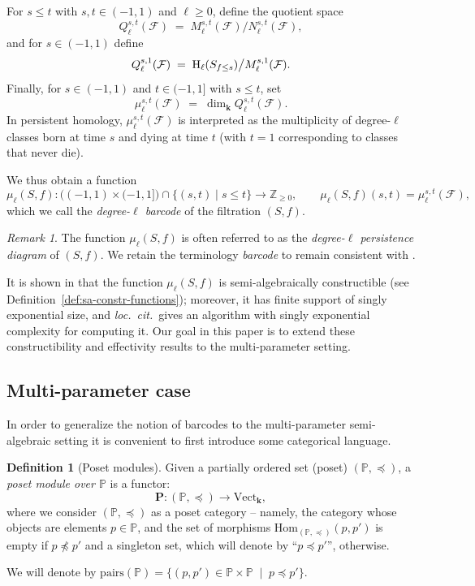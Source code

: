 \documentclass{amsart}[10pts]
\theoremstyle{definition}
\newtheorem{definition}{Definition}[section]
\theoremstyle{remark}
\newtheorem{remark}{Remark}
\theoremstyle{observation}
\numberwithin{equation}{section}
\newcommand {\Z}  {\mathbb{Z}}
\newcommand {\kk}         {\mathbf{k}}
\newcommand {\PP}     {\mathbb{P}} %
\newcommand{\HH}  {\mbox{\rm H}}
\newcommand{\Hom}{\mathrm{Hom}}
\newcommand{\Pairs}{\mathrm{pairs}}
\newcommand{\Vect}{\mathrm{Vect}}
\begin{document}
For $s\le t$ with $s,t\in(-1,1)$ and $\ell\ge 0$, define the quotient space
\[
Q^{s,t}_\ell(\mathcal F)\;=\;M^{s,t}_\ell(\mathcal F)\big/ N^{s,t}_\ell(\mathcal F),
\]
and for $s\in(-1,1)$ define
\[
Q^{s,1}_\ell(\mathcal F)\;=\;\HH_\ell(S_{f\le s})\big/ M^{s,1}_\ell(\mathcal F).
\]
Finally, for $s\in(-1,1)$ and $t\in(-1,1]$ with $s\le t$, set
\[
\mu^{s,t}_\ell(\mathcal F)\;=\;\dim_{\kk} Q^{s,t}_\ell(\mathcal F).
\]
In persistent homology, $\mu^{s,t}_\ell(\mathcal F)$ is interpreted as the multiplicity of degree-$\ell$ classes born at time $s$ and dying at time $t$ (with $t=1$ corresponding to classes that never die).

\medskip
We thus obtain a function
\begin{equation}
\label{eqn:barcode-sa-mu}
\mu_\ell(S,f):
\bigl(({-}1,1)\times({-}1,1]\bigr)\cap\{(s,t)\mid s\le t\}\longrightarrow \Z_{\ge 0},
\qquad
\mu_\ell(S,f)(s,t)=\mu^{s,t}_\ell(\mathcal F),
\end{equation}
which we call the \emph{degree-$\ell$ barcode} of the filtration $(S,f)$.

\begin{remark}
\label{rem:barcode-sa-mu}
The function $\mu_\ell(S,f)$ is often referred to as the \emph{degree-$\ell$ persistence diagram} of $(S,f)$.
We retain the terminology \emph{barcode} to remain consistent with \cite{Basu-Karisani-2}.
\end{remark}



It is shown in \cite{Basu-Karisani-2} that the function $\mu_\ell(S,f)$ is semi-algebraically constructible (see Definition~\ref{def:sa-constr-functions}); moreover, it has finite support of singly exponential size, and \emph{loc.\ cit.}\ gives an algorithm with singly exponential complexity for computing it.
Our goal in this paper is to extend these constructibility and effectivity results to the multi-parameter setting.


\subsection{Multi-parameter case}
\label{subsec:intro:mp}
In order to generalize the notion of barcodes to the multi-parameter
semi-algebraic setting it is convenient to first introduce some categorical language.

\begin{definition}[Poset modules]
\label{def:poset-module}
    Given a partially ordered set  (poset) $(\PP,\preceq)$, a
\emph{poset module over $\PP$} is a functor:
\[
\mathbf{P}: (\PP,\preceq) \rightarrow \Vect_{\mathbf{k}},
\]
where  we consider $(\PP,\preceq)$ as a poset category -- namely, the category whose objects are elements $p \in \PP$, and the set of morphisms $\Hom_{(\PP,\preceq )}(p,p')$ is empty if $p \not\preceq p'$ and a singleton set, 
which will denote by ``$p\preceq p'$'', otherwise.

We will denote by $\Pairs(\PP) = \{(p,p') \in \PP \times \PP \; \mid \; p \preceq p'\}$. 
\end{definition}
\end{document}
